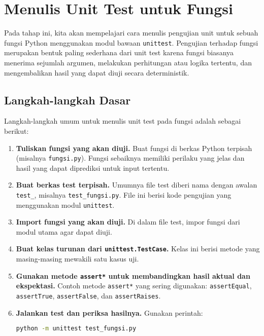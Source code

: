 \section{Menulis Unit Test untuk Fungsi}

Pada tahap ini, kita akan mempelajari cara menulis pengujian unit untuk sebuah fungsi Python menggunakan modul bawaan \texttt{unittest}.  
Pengujian terhadap fungsi merupakan bentuk paling sederhana dari unit test karena fungsi biasanya menerima sejumlah argumen, melakukan perhitungan atau logika tertentu, dan mengembalikan hasil yang dapat diuji secara deterministik.

\subsection{Langkah-langkah Dasar}

Langkah-langkah umum untuk menulis unit test pada fungsi adalah sebagai berikut:

\begin{enumerate}
    \item \textbf{Tuliskan fungsi yang akan diuji.}  
    Buat fungsi di berkas Python terpisah (misalnya \texttt{fungsi.py}).  
    Fungsi sebaiknya memiliki perilaku yang jelas dan hasil yang dapat diprediksi untuk input tertentu.

    \item \textbf{Buat berkas test terpisah.}  
    Umumnya file test diberi nama dengan awalan \texttt{test\_}, misalnya \texttt{test\_fungsi.py}.  
    File ini berisi kode pengujian yang menggunakan modul \texttt{unittest}.

    \item \textbf{Import fungsi yang akan diuji.}  
    Di dalam file test, impor fungsi dari modul utama agar dapat diuji.

    \item \textbf{Buat kelas turunan dari \texttt{unittest.TestCase}.}  
    Kelas ini berisi metode yang masing-masing mewakili satu kasus uji.

    \item \textbf{Gunakan metode \texttt{assert*} untuk membandingkan hasil aktual dan ekspektasi.}  
    Contoh metode \texttt{assert*} yang sering digunakan:  
    \texttt{assertEqual}, \texttt{assertTrue}, \texttt{assertFalse}, dan \texttt{assertRaises}.

    \item \textbf{Jalankan test dan periksa hasilnya.}  
    Gunakan perintah:
    \begin{lstlisting}[language=bash]
    python -m unittest test_fungsi.py
    \end{lstlisting}
\end{enumerate}

